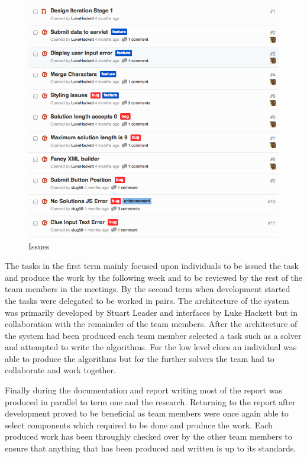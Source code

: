 \begin{figure}[H]
  \centering
  \includegraphics[width=\linewidth]{images/issues1.png}
  \caption{Issues}
  \label{fig:Issues}
\end{figure}

The tasks in the first term mainly focused upon individuals to be issued the task and produce the work by the following week and to be reviewed by the rest of the team members in the meetings. By the second term when development started the tasks were delegated to be worked in pairs. The architecture of the system was primarily developed by Stuart Leader and interfaces by Luke Hackett but in collaboration with the remainder of the team members. After the architecture of the system had been produced each team member selected a task such as a solver and attempted to write the algorithms. For the low level clues an individual was able to produce the algorithms but for the further solvers the team had to collaborate and work together.

Finally during the documentation and report writing most of the report was produced in parallel to term one and the research. Returning to the report after development proved to be beneficial as team members were once again able to select components which required to be done and produce the work. Each produced work has been throughly checked over by the other team members to ensure that anything that has been produced and written is up to its standards.